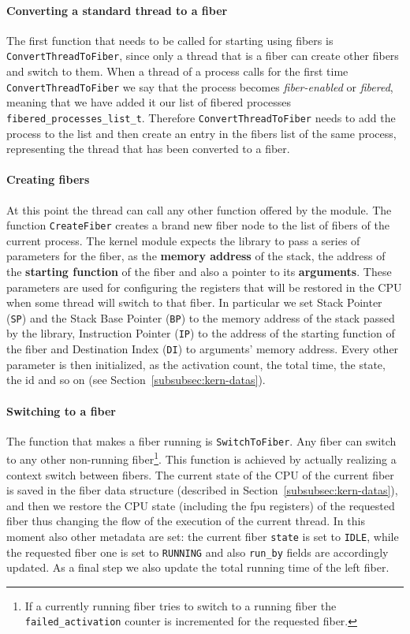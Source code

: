 \documentclass[a4paper,10pt]{article}
\begin{document}
  \paragraph{Converting a standard thread to a fiber}
    The first function that needs to be called for starting using fibers is \lstinline{ConvertThreadToFiber}, since only a thread that is a fiber can create other fibers and switch to them. When a thread of a process calls for the first time \lstinline{ConvertThreadToFiber} we say that the process becomes \textit{fiber-enabled} or \textit{fibered}, meaning that we have added it our list of fibered processes \lstinline{fibered_processes_list_t}. Therefore \lstinline{ConvertThreadToFiber} needs to add the process to the list and then create an entry in the fibers list of the same process, representing the thread that has been converted to a fiber.

  \paragraph{Creating fibers}
    At this point the thread can call any other function offered by the module. The function \lstinline{CreateFiber} creates a brand new fiber node to the list of fibers of the current process. The kernel module expects the library to pass a series of parameters for the fiber, as the \textbf{memory address} of the stack, the address of the \textbf{starting function} of the fiber and also a pointer to its \textbf{arguments}. These parameters are used for configuring the registers that will be restored in the CPU when some thread will switch to that fiber. In particular we set Stack Pointer (\texttt{SP}) and the Stack Base Pointer (\texttt{BP}) to the memory address of the stack passed by the library, Instruction Pointer (\texttt{IP}) to the address of the starting function of the fiber and Destination Index (\texttt{DI}) to arguments’ memory address. Every other parameter is then initialized, as the activation count, the total time, the state, the id and so on (see Section~\ref{subsubsec:kern-datas}).

  \paragraph{Switching to a fiber}
    The function that makes a fiber running is \lstinline{SwitchToFiber}. Any fiber can switch to any other non-running fiber\footnote{If a currently running fiber tries to switch to a running fiber the \lstinline{failed_activation} counter is incremented for the requested fiber.}. This function is achieved by actually realizing a context switch between fibers. The current state of the CPU of the current fiber is saved in the fiber data structure (described in Section~\ref{subsubsec:kern-datas}), and then we restore the CPU state (including the fpu registers) of the requested fiber thus changing the flow of the execution of the current thread. In this moment also other metadata are set: the current fiber \lstinline{state} is set to \texttt{IDLE}, while the requested fiber one is set to \texttt{RUNNING} and also \lstinline{run_by} fields are accordingly updated. As a final step we also update the total running time of the left fiber.
\end{document}
